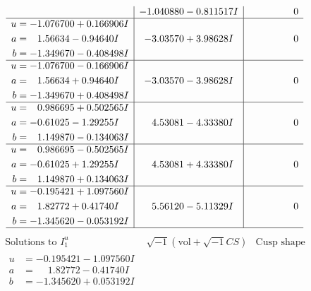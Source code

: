 \documentclass[1p]{elsarticle_modified}
\theoremstyle{definition}
\newcommand{\I}{\sqrt{-1}}
\begin{document}
$$\begin{array}{c|c|c}
 & -1.040880 - 0.811517 I & \phantom{-0.000000 } 0 \\ \hline\begin{aligned}
u &= -1.076700 + 0.166906 I \\
a &= \phantom{-}1.56634 - 0.94640 I \\
b &= -1.349670 - 0.408498 I\end{aligned}
 & -3.03570 + 3.98628 I & \phantom{-0.000000 } 0 \\ \hline\begin{aligned}
u &= -1.076700 - 0.166906 I \\
a &= \phantom{-}1.56634 + 0.94640 I \\
b &= -1.349670 + 0.408498 I\end{aligned}
 & -3.03570 - 3.98628 I & \phantom{-0.000000 } 0 \\ \hline\begin{aligned}
u &= \phantom{-}0.986695 + 0.502565 I \\
a &= -0.61025 - 1.29255 I \\
b &= \phantom{-}1.149870 - 0.134063 I\end{aligned}
 & \phantom{-}4.53081 - 4.33380 I & \phantom{-0.000000 } 0 \\ \hline\begin{aligned}
u &= \phantom{-}0.986695 - 0.502565 I \\
a &= -0.61025 + 1.29255 I \\
b &= \phantom{-}1.149870 + 0.134063 I\end{aligned}
 & \phantom{-}4.53081 + 4.33380 I & \phantom{-0.000000 } 0 \\ \hline\begin{aligned}
u &= -0.195421 + 1.097560 I \\
a &= \phantom{-}1.82772 + 0.41740 I \\
b &= -1.345620 - 0.053192 I\end{aligned}
 & \phantom{-}5.56120 - 5.11329 I & \phantom{-0.000000 } 0\\
 \hline 
 \end{array}$$\newpage$$\begin{array}{c|c|c}  
\text{Solutions to }I^u_{1}& \I (\text{vol} + \sqrt{-1}CS) & \text{Cusp shape}\\
 \hline 
\begin{aligned}
u &= -0.195421 - 1.097560 I \\
a &= \phantom{-}1.82772 - 0.41740 I \\
b &= -1.345620 + 0.053192 I\end{aligned}

\end{array}$$
\end{document}
